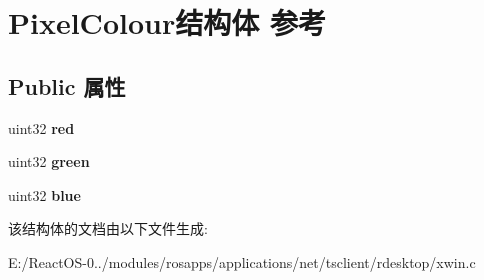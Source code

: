\hypertarget{struct_pixel_colour}{}\section{Pixel\+Colour结构体 参考}
\label{struct_pixel_colour}
\subsection*{Public 属性}
\begin{DoxyCompactItemize}
\item 
\mbox{\label{struct_pixel_colour_a7a4093911c48208e5093064395210da5}} 
uint32 {\bfseries red}
\item 
\mbox{\label{struct_pixel_colour_a1d53f97e53ba04caf1425ed6801d1f42}} 
uint32 {\bfseries green}
\item 
\mbox{\label{struct_pixel_colour_a7d47dd321ecc901b115d501139a6e0a8}} 
uint32 {\bfseries blue}
\end{DoxyCompactItemize}


该结构体的文档由以下文件生成\+:\begin{DoxyCompactItemize}
\item 
E\+:/\+React\+O\+S-\/0../modules/rosapps/applications/net/tsclient/rdesktop/xwin.\+c\end{DoxyCompactItemize}
